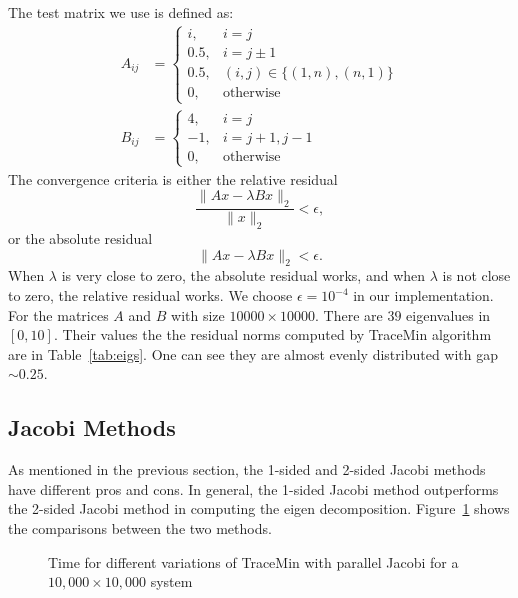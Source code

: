 \label{sec:results}
The test matrix we use is defined as:
\begin{align}
	A_{ij} &=
\begin{cases}
	i, &i =j \\
0.5, &i = j\pm 1 \\
0.5, &(i, j) \in \{(1, n), (n,1)\} \\
0, &\text{otherwise}
\end{cases}\\
B_{ij} &= 
\begin{cases}
	4, &i = j \\
	-1, &i = j+1, j-1 \\
	0, &\text{otherwise}
\end{cases}
\end{align}
The convergence criteria is either the relative residual
\begin{equation}
	\dfrac{\|Ax-\lambda B x\|_2}{\|x\|_2} < \epsilon,
\end{equation}
or the absolute residual
\begin{equation}
	\|Ax-\lambda B x\|_2 < \epsilon.
\end{equation}
When $\lambda$ is very close to zero, the absolute residual works, and when $\lambda$ is not close to zero, the relative residual works. We choose $\epsilon = 10^{-4}$ in our implementation. For the matrices $A$ and $B$ with size $10000 \times 10000$. There are $39$ eigenvalues in $[0, 10]$. Their values the the residual norms computed by TraceMin algorithm are in Table~\ref{tab:eigs}. One can see they are almost evenly distributed with gap $\sim 0.25$. 

\subsection{Jacobi Methods}
As mentioned in the previous section, the 1-sided and 2-sided Jacobi methods have different pros and cons. In general,
the 1-sided Jacobi method outperforms the 2-sided Jacobi method in computing the eigen decomposition.
Figure~\ref{fig:jacobi} shows the comparisons between the two methods.

\begin{figure}[htbp]
	\centering
	\caption{Time for different variations of TraceMin with parallel Jacobi for a $10,000 \times 10,000$ system}
  \label{fig:jacobi}
\end{figure}

